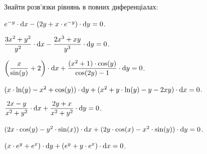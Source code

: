 Знайти розв'язки рівнянь в повних диференціалах:

\begin{problem}
	$e^{-y} \cdot \mathop{}\!\mathrm{d} x - (2 y + x \cdot e^{-y}) \cdot \mathop{}\!\mathrm{d} y = 0$.
\end{problem}

\begin{problem}
	$\dfrac{3 x^2 + y^2}{y^2} \cdot \mathop{}\!\mathrm{d} x - \dfrac{2 x^3 + x y}{y^3} \cdot \mathop{}\!\mathrm{d} y = 0$.
\end{problem}

\begin{problem}
	$\left( \dfrac{x}{\sin (y)} + 2 \right) \cdot \mathop{}\!\mathrm{d} x + \dfrac{(x^2 + 1) \cdot \cos (y)}{\cos (2 y) - 1} \cdot \mathop{}\!\mathrm{d} y = 0$.
\end{problem}

\begin{problem}
	$(x \cdot \ln (y) - x^2 + \cos (y)) \cdot \mathop{}\!\mathrm{d} y + (x^2 + y \cdot \ln (y) - y - 2 x y) \cdot \mathop{}\!\mathrm{d} x = 0$.
\end{problem}

\begin{problem}
	$\dfrac{2 x - y}{x^2 + y^2} \cdot \mathop{}\!\mathrm{d} x + \dfrac{2 y + x}{x^2 + y^2} \cdot \mathop{}\!\mathrm{d} y = 0$.
\end{problem}

\begin{problem}
	$(2 x \cdot \cos (y) - y^2 \cdot \sin (x)) \cdot \mathop{}\!\mathrm{d} x + (2 y \cdot \cos (x) - x^2 \cdot \sin (y)) \cdot \mathop{}\!\mathrm{d} y = 0$.
\end{problem}

\begin{problem}
	$(x \cdot e^y + e^x) \cdot \mathop{}\!\mathrm{d} y + (e^y + y \cdot e^x) \cdot \mathop{}\!\mathrm{d} x = 0$.
\end{problem}
